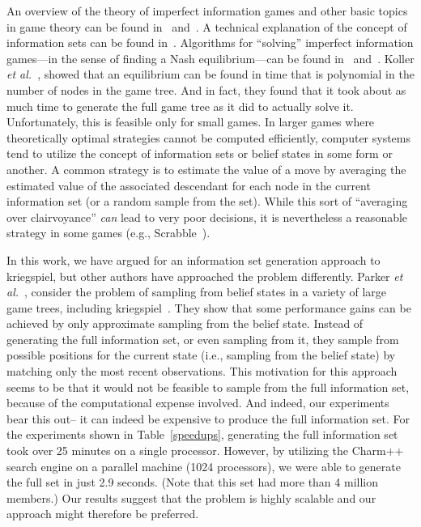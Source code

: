\documentclass[times, 10pt,twocolumn]{article}
\newcommand{\etal}{{\em et al.}\ }
\begin{document}
An overview of the theory of imperfect information games and other basic topics in game theory can be found
in~\cite{kuhn03lectures} and~\cite{kuhn97classics}.  A technical explanation of the concept of information sets can be
found in~\cite{gilpin07algorithms}.  Algorithms for ``solving'' imperfect information games---in the sense of finding a
Nash equilibrium---can be found in~\cite{koller94fast} and~\cite{koller97representations}.  Koller \etal, showed that an
equilibrium can be found in time that is polynomial in the number of nodes in the game tree.  And in fact, they found
that it took about as much time to generate the full game tree as it did to actually solve it.  Unfortunately, this is
feasible only for small games.  In larger games where theoretically optimal strategies cannot be computed efficiently,
computer systems tend to utilize the concept of information sets or belief states in some form or another.  A common
strategy is to estimate the value of a move by averaging the estimated value of the associated descendant for each node
in the current information set (or a random sample from the set).  While this sort of ``averaging over clairvoyance''
{\em can} lead to very poor decisions, it is nevertheless a reasonable strategy in some games (e.g.,
Scrabble~\cite{sheppard02world}).

In this work, we have argued for an information set generation approach to kriegspiel, but other authors have approached
the problem differently.  Parker \etal, consider the problem of sampling from belief states in a variety of large game
trees, including kriegspiel~\cite{parker05game}.  They show that some performance gains can be achieved by only
approximate sampling from the belief state.  Instead of generating the full information set, or even sampling from it,
they sample from possible positions for the current state (i.e., sampling from the belief state) by matching only the
most recent observations.  This motivation for this approach seems to be that it would not be feasible to sample from
the full information set, because of the computational expense involved.  And indeed, our experiments bear this out-- it
can indeed be expensive to produce the full information set.  For the experiments shown in Table~\ref{speedups},
generating the full information set took over 25 minutes on a single processor.  However, by utilizing the Charm++
search engine on a parallel machine (1024 processors), we were able to generate the full set in just 2.9 seconds.  (Note
that this set had more than 4 million members.)  Our results suggest that the problem is highly scalable and our
approach might therefore be preferred.
\end{document}
